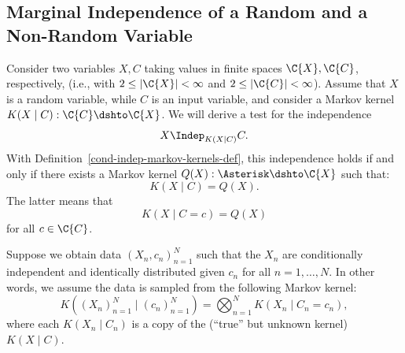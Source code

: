 \subsection{Marginal Independence of a Random and a Non-Random Variable}

Consider two variables $X,C$ taking values in finite spaces $\C{X},\C{C}$, respectively,
(i.e., with $2\le|\C{X}|<\infty$ and $2\le|\C{C}|<\infty$).
Assume that $X$ is a random variable, while $C$ is an input variable, 
and consider a Markov kernel $K(X\mid C) : \C{C} \dshto \C{X}$. 
We will derive a test for the independence $$X \Indep_{K(X\mid C)} C.$$
With Definition~\ref{cond-indep-markov-kernels-def}, this independence holds
if and only if there exists a Markov kernel $Q(X) : \Asterisk \dshto \C{X}$ such that:
\[ K(X\mid C) = Q(X).\]
The latter means that
\begin{equation}\label{eq:indep_test_CX}
  K(X \mid C=c) = Q(X)
\end{equation}
for all $c \in \C{C}$.

Suppose we obtain data $(X_n,c_n)_{n=1}^N$ such that the
$X_n$ are conditionally independent and identically distributed given $c_n$ for all $n=1,\dots,N$.
In other words, we assume the data is sampled from the following Markov kernel:
$$K((X_n)_{n=1}^N \mid (c_n)_{n=1}^N) = \bigotimes_{n=1}^N K(X_n \mid C_n=c_n),$$
where each $K(X_n \mid C_n)$ is a copy of the (``true'' but unknown kernel) $K(X \mid C)$.

